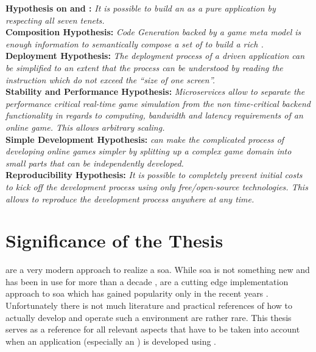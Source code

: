 \noindent\textbf{Hypothesis on \ogs{} and \mss{}:}
\textit{It is possible to build an \og{} as a pure \ms{} application by
respecting all seven \ms{} tenets.}\\

\noindent\textbf{Composition Hypothesis:}
\textit{Code Generation backed by a game meta model is enough information to
semantically compose a set of \mss{} to build a rich \og{}.}\\

\noindent\textbf{Deployment Hypothesis:}
\textit{The deployment process of a \ms{} driven \og{} application can be
simplified to an extent that the process can be understood by reading the instruction which
do not exceed the ``size of one screen''.}\\

\noindent\textbf{Stability and Performance Hypothesis:} 
\textit{Microservices allow to separate the performance critical real-time game
simulation from the non time-critical backend functionality in regards to
computing, bandwidth and latency requirements of an online game. This allows
arbitrary scaling.}\\

\noindent\textbf{Simple Development Hypothesis:} 
\textit{\mss{} can make the complicated process of developing online games
simpler by splitting up a complex game domain into small parts that can be independently
developed.}\\

\noindent\textbf{Reproducibility Hypothesis:} 
\textit{It is possible to completely prevent initial costs to kick off the
development process using only free/open-source technologies. This allows to reproduce the
development process anywhere at any time.}

\section{Significance of the Thesis}

\mss{} are a very modern approach to realize a \gls{soa}. While \gls{soa} is not
something new and has been in use for more than a decade \cite{josuttis2007soa},
\mss{} are a cutting edge implementation approach to \gls{soa} which has gained
popularity only in the recent years \cite{rajeev2016ms_popular}. Unfortunately
there is not much literature and practical references of how to actually develop
and operate such a \ms{} environment are rather rare. This thesis serves as a
reference for all relevant aspects that have to be taken into account when an
application (especially an \og{}) is developed using \mss{}.

